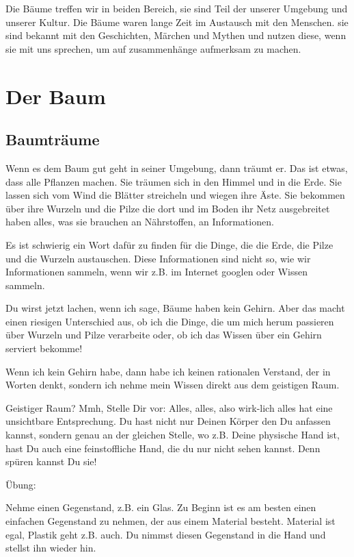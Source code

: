 \documentclass[11pt,titlepage,a5paper]{book}
\begin{document}
Die Bäume treffen wir in beiden Bereich, sie sind Teil der unserer Umgebung und unserer Kultur. Die Bäume waren lange Zeit im Austausch mit den Menschen. sie sind bekannt mit den Geschichten, Märchen und Mythen und nutzen diese, wenn sie mit uns sprechen, um auf zusammenhänge aufmerksam zu machen.

\chapter{Der Baum}

\section{Baumträume}

Wenn es dem Baum gut geht in seiner Umgebung, dann träumt er. Das ist etwas, dass alle Pflanzen machen. Sie träumen sich in den Himmel und in die Erde. Sie lassen sich vom Wind die Blätter streicheln und wiegen ihre Äste. Sie bekommen über ihre Wurzeln und die Pilze die dort und im Boden ihr Netz ausgebreitet haben alles, was sie brauchen an Nährstoffen, an Informationen.

Es ist schwierig ein Wort dafür zu finden für die Dinge, die die Erde, die Pilze und die Wurzeln austauschen. Diese Informationen sind nicht so, wie wir Informationen sammeln, wenn wir z.B. im Internet googlen oder Wissen sammeln. 

Du wirst jetzt lachen, wenn ich sage, Bäume haben kein Gehirn. Aber das macht einen riesigen Unterschied aus, ob ich die Dinge, die um mich herum passieren über Wurzeln und Pilze verarbeite oder, ob ich das Wissen über ein Gehirn serviert bekomme!

Wenn ich kein Gehirn habe, dann habe ich keinen rationalen Verstand, der in Worten denkt, sondern ich nehme mein Wissen direkt aus dem geistigen Raum.

Geistiger Raum? Mmh, Stelle Dir vor: Alles, alles, also wirk-lich alles hat eine unsichtbare Entsprechung. Du hast nicht nur Deinen Körper den Du anfassen kannst, sondern genau an der gleichen Stelle, wo z.B. Deine physische Hand ist, hast Du auch eine feinstoffliche Hand, die du nur nicht sehen kannst. Denn spüren kannst Du sie! 

Übung:

 Nehme einen Gegenstand, z.B. ein Glas. Zu Beginn ist es am besten einen einfachen Gegenstand zu nehmen, der aus einem Material besteht. Material ist egal, Plastik geht z.B. auch. Du nimmst diesen Gegenstand in die Hand und stellst ihn wieder hin. 
\end{document}
